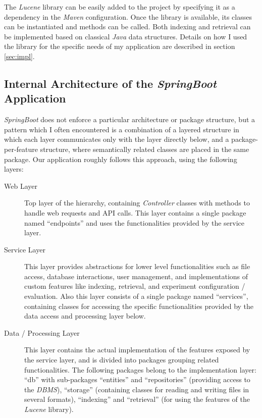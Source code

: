 \documentclass[a4paper]{usiinfbachelorproject}
\begin{document}
The \emph{Lucene} library can be easily added to the project by specifying it as a dependency in the \emph{Maven} configuration.
Once the library is available, its classes can be instantiated and methods can be called. Both indexing and retrieval can
be implemented based on classical \emph{Java} data structures. Details on how
I used the library for the specific needs of my application are described in section \ref{sec:impl}.

\subsection{\textbf{Internal Architecture of the \emph{SpringBoot} Application}} \label{sec:archBackend}

\emph{SpringBoot} does not enforce a particular architecture or package structure, but a pattern which I often encountered is a combination
of a layered structure in which each layer communicates only with the layer directly below, and a package-per-feature structure, where 
semantically related classes are placed in the same package. Our application roughly follows this approach, using the following layers:

    \begin{description}

        \item[Web Layer]
        Top layer of the hierarchy, containing \emph{Controller} classes with methods to handle web requests and API calls.
        This layer contains a single package named ``endpoints'' and uses the functionalities provided by the service layer.

        \item[Service Layer]
        This layer provides abstractions for lower level functionalities such as file access, database interactions, user management, and
        implementations of custom features like indexing, retrieval, and experiment configuration / evaluation.
        Also this layer consists of a single package named ``services'', containing classes for accessing the specific functionalities
        provided by the data access and processing layer below.

        \item[Data / Processing Layer]
        This layer contains the actual implementation of the features exposed by the service layer, and is divided into packages 
        grouping related functionalities. The following packages belong to the implementation layer:
        ``db'' with sub-packages ``entities'' and ``repositories'' (providing access to the \emph{DBMS}), 
        ``storage'' (containing classes for reading and writing files in several formats),  
        ``indexing'' and ``retrieval'' (for using the features of the \emph{Lucene} library).

    \end{description}
\end{document}
